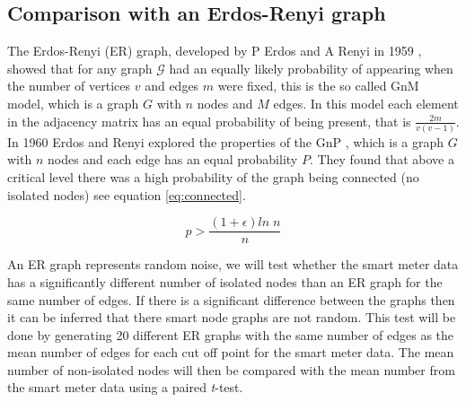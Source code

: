 \subsection{Comparison with an Erdos-Renyi graph}
The Erdos-Renyi (ER) graph, developed by P Erdos and A Renyi in 1959 \cite{erdos1959}, showed that for any graph $\mathcal{G}$ had an equally likely probability of appearing when the number of vertices $v$ and edges $m$ were fixed, this is the so called GnM model, which is a graph $G$ with $n$ nodes and $M$ edges. In this model each element in the adjacency matrix has an equal probability of being present, that is $\frac{2m}{v(v-1)}$. In 1960 Erdos and Renyi explored the properties of the GnP \cite{erds1960}, which is a graph $G$ with $n$ nodes and each edge has an equal probability $P$. They found that above a critical level there was a high probability of the graph being connected (no isolated nodes) see equation \ref{eq:connected}. 

\begin{equation}
\label{eq:connected}
    p>\frac{(1+\epsilon)ln \; n }{n}
\end{equation}

An ER graph represents random noise, we will test whether the smart meter data has a significantly different number of isolated nodes than an ER graph for the same number of edges. If there is a significant difference between the graphs then it can be inferred that there smart node graphs are not random. This test will be done by generating 20 different ER graphs with the same number of edges as the mean number of edges for each cut off point for the smart meter data. The mean number of non-isolated nodes will then be compared with the mean number from the smart meter data using a paired \textit{t}-test.

